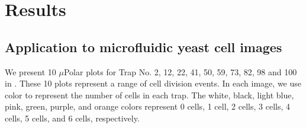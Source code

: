 \documentclass[conference]{IEEEtran}
\begin{document}
\section{Results}


\subsection{Application to  microfluidic yeast cell images}
We present 10 $\mu$Polar plots for Trap No. 2, 12, 22, 41, 50, 59, 73, 82, 98 and 100 in . These 10 plots represent a range of cell division events. 
In each image, we use color to represent the number of cells in each trap. 
The white, black, light blue, pink, green, purple, and orange colors represent 0 cells, 1 cell, 2 cells, 3 cells, 4 cells, 5 cells, and 6 cells, respectively.
\end{document}
